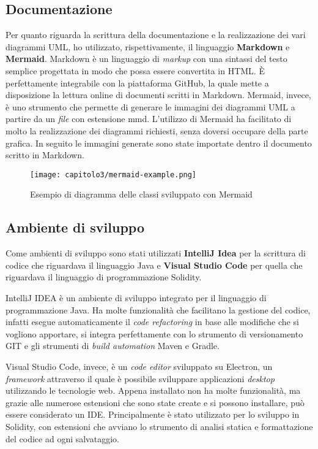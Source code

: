 \subsection{Documentazione}
Per quanto riguarda la scrittura della documentazione e la realizzazione dei vari diagrammi UML, ho utilizzato, rispettivamente, il linguaggio \textbf{Markdown} e \textbf{Mermaid}. Markdown è un linguaggio di \textit{markup} con una sintassi del testo semplice progettata in modo che possa essere convertita in HTML. È perfettamente integrabile con la piattaforma GitHub, la quale mette a disposizione la lettura online di documenti scritti in Markdown.
Mermaid, invece, è uno strumento che permette di generare le immagini dei diagrammi UML a partire da un \textit{file} con estensione mmd. L'utilizzo di Mermaid ha facilitato di molto la realizzazione dei diagrammi richiesti, senza doversi occupare della parte grafica. In seguito le immagini generate sono state importate dentro il documento scritto in Markdown.

\clearpage
\begin{figure}[h!]
  \centering
  \texttt{[image: capitolo3/mermaid-example.png]}
  \caption{Esempio di diagramma delle classi sviluppato con Mermaid}
\end{figure}

\subsection{Ambiente di sviluppo}
Come ambienti di sviluppo sono stati utilizzati \textbf{IntelliJ Idea} per la scrittura di codice che riguardava il linguaggio Java e \textbf{Visual Studio Code} per quella che riguardava il linguaggio di programmazione Solidity.

IntelliJ IDEA è un ambiente di sviluppo integrato per il linguaggio di programmazione Java. Ha molte funzionalità che facilitano la gestione del codice, infatti esegue automaticamente il \textit{code refactoring} in base alle modifiche che si vogliono apportare, si integra perfettamente con lo strumento di versionamento GIT e gli strumenti di \textit{build automation} Maven e Gradle.

Visual Studio Code, invece, è un \textit{code editor} sviluppato su Electron, un \textit{framework} attraverso il quale è possibile sviluppare applicazioni \textit{desktop} utilizzando le tecnologie web. Appena installato non ha molte funzionalità, ma grazie alle numerose estensioni che sono state create e si possono installare, può essere considerato un IDE. Principalmente è stato utilizzato per lo sviluppo in Solidity, con estensioni che avviano lo strumento di analisi statica e formattazione del codice ad ogni salvataggio.

